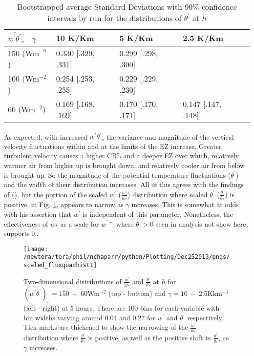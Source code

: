 \begin{table}[htbp]
\caption[]{Bootstrapped average Standard Deviations with 90$\%$ confidence intervals by run for the distributions of $\theta^{'}$ at $h$}
    \begin{tabular}{p{2.2cm} p{2.2cm}  p{2.2cm}  p{2.2cm} p{2.2cm} }
     $\overline{w^{'}\theta^{'}}_{s}$ \ $\gamma$ & 10 K/Km & 5 K/Km & 2.5 K/Km  \\ \hline
     150 (Wm$^{-2}$)&  0.330 [.329, .331]& 0.299 [.298, .300]& \\
     100 (Wm$^{-2}$)&  0.254 [.253, .255]& 0.229 [.229, .230]& \\
     60 (Wm$^{-2}$) &  0.169 [.168, .169]& 0.170 [.170, .171]& 0.147 [.147, .148]\\ \hline
    \end{tabular}
\label{tab:stdevtheta}   
\end{table}

As expected, with increased $\overline{w^{'}\theta^{'}}_{s}$ the variance and magnitude of the vertical velocity fluctuations within and at the limits of the EZ increase.  Greater turbulent velocity causes a higher CBL and a deeper EZ over which, relatively warmer air from higher up is brought down, and relatively cooler air from below is brought up.  So the magnitude of the potential temperature fluctuations ($\theta^{'}$) and the width of their distribution increases. All of this agrees with the findings of \citeauthor{Sorbjan1} (\citeyear{Sorbjan1}), but the portion of the scaled $w^{'}$ ($\frac{w^{'}}{w_{*}}$) distribution where scaled $\theta^{'}$ ($\frac{\theta^{'}}{\theta_{*}}$) is positive, in Fig. \ref{fig:scaled_fluxquadhs}, appears to narrow as $\gamma$ increases. This is somewhat at odds with his assertion that $w^{'}$ is independent of this parameter. Nonetheless, the effectiveness of $w_{*}$ as a scale for $w^{'-}$ where $\theta^{'}>0$ seen in analysis not show here, supports it.\\


\begin{figure}[htbp]
\centering
 \texttt{[image: /newtera/tera/phil/nchaparr/python/Plotting/Dec252013/pngs/scaled\_fluxquadhist1]}                 
\caption[Two-dimensional Distributions of $\frac{w^{'}}{w_{*}}$ and $\frac{\theta^{'}}{\theta_{*}}$ for all Runs]{Two-dimensional distributions of $\frac{w^{'}}{w_{*}}$ and $\frac{\theta^{'}}{\theta_{*}}$ at $h$ for $(\overline{w^{'}\theta^{'}})_{s} = 150 \ - \ 60$Wm$^{-2}$ (top - bottom) and $\gamma = 10 \ - \  2.5$Kkm$^{-1}$ (left - right) at 5 hours. There are 100 bins for each variable with bin widths varying around 0.04 and 0.27 for $w^{'}$ and $\theta^{'}$ respectively. Tick-marks are thickened to show the narrowing of the $\frac{w^{'}}{w_{*}}$ distribution where $\frac{\theta^{'}}{\theta_{*}}$ is positive, as well as the positive shift in $\frac{\theta^{'}}{\theta_{*}}$, as $\gamma$ increases.}
\label{fig:scaled_fluxquadhs}
\end{figure}


